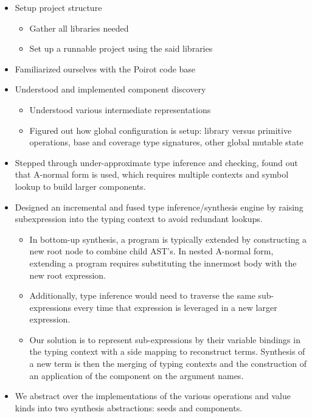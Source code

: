 \documentclass[review, sigplan]{acmart}
\begin{document}
\begin{itemize}
    \item Setup project structure
          \begin{itemize}
              \item Gather all libraries needed
              \item Set up a runnable project using the said libraries
          \end{itemize}
    \item Familiarized ourselves with the Poirot code base
    \item Understood and implemented component discovery
          \begin{itemize}
              \item Understood various intermediate representations
              \item Figured out how global configuration is setup: library versus primitive operations, base and coverage type
              signatures, other global mutable state
          \end{itemize}
    \item Stepped through under-approximate type inference and checking, found out that A-normal form is used, which requires multiple contexts and symbol lookup to build larger components.
    \item Designed an incremental and fused type inference/synthesis engine by raising subexpression into the typing context to avoid redundant lookups.
          \begin{itemize}
              \item In bottom-up synthesis, a program is typically extended by constructing a new root node to combine child AST's. In nested A-normal form, extending a program requires substituting the innermost body with the new root expression.
              \item Additionally, type inference would need to traverse the same sub-expressions every time that expression is leveraged in a new larger expression.
              \item Our solution is to represent sub-expressions by their variable bindings in the typing context with a side mapping to reconstruct terms. Synthesis of a new term is then the merging of typing contexts and the construction of an application of the component on the argument names.
          \end{itemize}
    \item We abstract over the implementations of the various operations and value kinds into two synthesis abstractions: seeds and components.

\end{itemize}
\end{document}

